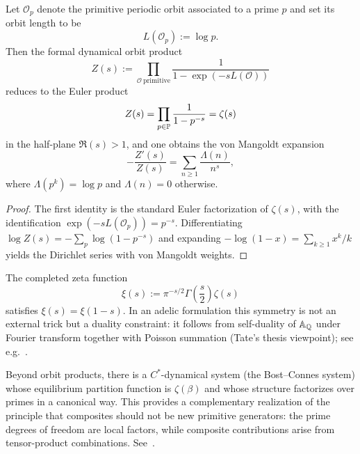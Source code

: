 \begin{corollary}
\label{cor:prime_orbit_product}
Let $\mathcal{O}_p$ denote the primitive periodic orbit associated to a prime $p$ and set its orbit length to be
$$
L(\mathcal{O}_p):=\log p.
$$
Then the formal dynamical orbit product
$$
Z(s):=\prod_{\mathcal{O}\ \mathrm{primitive}}\frac{1}{1-\exp(-sL(\mathcal{O}))}
$$
reduces to the Euler product
$$
Z(s)=\prod_{p\in\mathbb{P}}\frac{1}{1-p^{-s}}=\zeta(s)
$$
in the half-plane $\Re(s)>1$, and one obtains the von Mangoldt expansion
$$
-\frac{Z'(s)}{Z(s)}=\sum_{n\ge 1}\frac{\Lambda(n)}{n^s},
$$
where $\Lambda(p^k)=\log p$ and $\Lambda(n)=0$ otherwise.
\end{corollary}

\begin{proof}
The first identity is the standard Euler factorization of $\zeta(s)$, with the identification $\exp(-sL(\mathcal{O}_p))=p^{-s}$. Differentiating $\log Z(s)=-\sum_p\log(1-p^{-s})$ and expanding $-\log(1-x)=\sum_{k\ge 1}x^k/k$ yields the Dirichlet series with von Mangoldt weights.
\end{proof}

\begin{remark}
The completed zeta function
$$
\xi(s):=\pi^{-s/2}\Gamma\!\left(\frac{s}{2}\right)\zeta(s)
$$
satisfies $\xi(s)=\xi(1-s)$. In an adelic formulation this symmetry is not an external trick but a duality constraint: it follows from self-duality of $\mathbb{A}_{\mathbb{Q}}$ under Fourier transform together with Poisson summation (Tate's thesis viewpoint); see e.g.~\cite{TateThesis1967}.
\end{remark}

\begin{remark}
Beyond orbit products, there is a $C^*$-dynamical system (the Bost--Connes system) whose equilibrium partition function is $\zeta(\beta)$ and whose structure factorizes over primes in a canonical way. This provides a complementary realization of the principle that composites should not be new primitive generators: the prime degrees of freedom are local factors, while composite contributions arise from tensor-product combinations. See~\cite{BostConnes1995}.
\end{remark}


